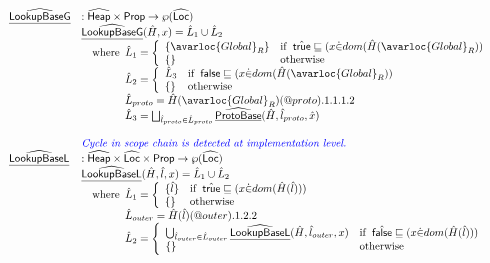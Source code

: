 \[\begin{array}{ll}
\ahf{LookupBaseG} & : \aHeap \times \SF{Prop} \rightarrow \powerset{\aLoc}\\
&
  \ahf{LookupBaseG}(\hat{H},x)
   = \hat{L}_1\cup\hat{L}_2\\
& \quad\wherec{
  \hat{L}_1 = \left\{
    \begin{array}{ll}
      \{\avarloc{Global}_R\}
      & \ifc{\atrue\sqsubseteq(x \dot{\in} dom(\hat{H}(\avarloc{Global}_R))} \\
      \{\}
      & \owc \\
    \end{array}\right. \\
  \hat{L}_2 = \left\{
    \begin{array}{ll}
      \hat{L}_3
      & \ifc{\vfalse\sqsubseteq(x \dot{\in} dom(\hat{H}(\avarloc{Global}_R))}\\
      \{\}
      & \owc \\
    \end{array}\right. \\
  \hat{L}_{proto} = \hat{H}(\avarloc{Global}_R)(\varprop{proto}).1.1.1.2\\
  \hat{L}_3 = 
    \bigsqcup_{\hat{l}_{proto}\in\hat{L}_{proto}}
    \ahf{ProtoBase}(\hat{H}, \hat{l}_{proto}, \hat{x})\\
}
\\\\

& {\inblue \textit{Cycle in scope chain is detected at implementation level.}} \\
\ahf{LookupBaseL} & : \aHeap \times \aLoc \times \SF{Prop} \rightarrow \powerset{\aLoc} \\
& \ahf{LookupBaseL}(\hat{H}, \hat{l}, x) = \hat{L}_1\cup\hat{L}_2 \\
& \quad\wherec{
    \hat{L}_1 =
      \left\{
      \begin{array}{ll}
        \{ \hat{l} \} & \ifc{\atrue \sqsubseteq (x \dot{\in} dom(\hat{H}(\hat{l})))} \\
        \{ \} & \owc \\
      \end{array}
      \right.\\
    \hat{L}_{outer} = \hat{H}(\hat{l})(\varprop{outer}).1.2.2 \\
    \hat{L}_2 =
      \left\{
      \begin{array}{ll}
        \bigcup_{\hat{l}_{outer}\in\hat{L}_{outer}}\ahf{LookupBaseL}(\hat{H}, \hat{l}_{outer}, x)
          & \ifc{\afalse \sqsubseteq (x \dot{\in} dom(\hat{H}(\hat{l})))} \\
        \set{} & \owc \\
      \end{array}
      \right.\\
  } \\
\\
\end{array}
\]
\\

